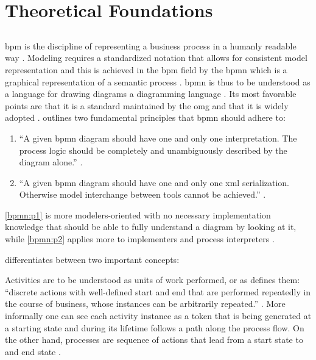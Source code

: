 \chapter{Theoretical Foundations}
\label{ch:foundations}

\section{}
\label{sec:bpmn}

\gls{bpm} is the discipline of representing a business process in a humanly readable way \citep{Silver2011}. Modeling requires a standardized notation that allows for consistent model representation and this is achieved in the \gls{bpm} field by the \gls{bpmn} which is a graphical representation of a semantic process \citep{Silver2011}. \gls{bpmn} is thus to be understood as a language for drawing diagrams \ie a diagramming language \citep{Silver2011}. Its most favorable points are that it is a standard maintained by the \gls{omg} and that it is widely adopted \citep{Silver2011}. \citet{Silver2011} outlines two fundamental principles that \gls{bpmn} should adhere to:

\begin{enumerate}[label=\textbf{P. \Roman*},ref=Principle \Roman*]
 	\item ``A given \gls{bpmn} diagram should have one and only one interpretation. The process logic should be completely and unambiguously described by the diagram alone.'' \citep[p. v]{Silver2011}. \label{bpmn:p1}
 	\item ``A given \gls{bpmn} diagram should have one and only one \gls{xml} serialization. Otherwise model interchange between tools cannot be achieved.'' \citep[p. v]{Silver2011}. \label{bpmn:p2}
\end{enumerate} 

\ref{bpmn:p1} is more modelers-oriented with no necessary implementation knowledge that should be able to fully understand a diagram by looking at it, while \ref{bpmn:p2} applies more to implementers and process interpreters \citep{Silver2011}. 

\citet{Silver2011} differentiates between two important concepts:

\begin{enumerate}
	 Activities are to be understood as units of work performed, or as \citet{Silver2011} defines them: ``discrete actions with well-defined start and end that are performed repeatedly in the course of business, whose instances can be arbitrarily repeated.'' \citep[p. 10]{Silver2011}.
	 More informally one can see each activity instance as a token that is being generated at a starting state and during its lifetime follows a path along the process flow. On the other hand, processes are sequence of actions that lead from a start state to and end state \citep[p. 11]{Silver2011}.
\end{enumerate}

